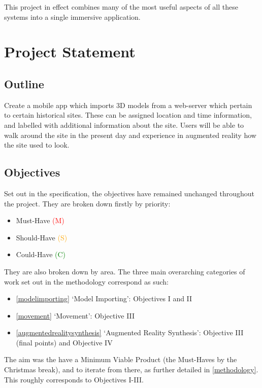 \documentclass{article}
\newcommand{\must}[1]{\textcolor{red}{#1}}
\newcommand{\should}[1]{\textcolor{orange}{#1}}
\newcommand{\could}[1]{\textcolor{green}{#1}}
\begin{document}
This project in effect combines many of the most useful aspects of all these systems into a single immersive application.

\section{Project Statement}
\subsection{Outline}
Create a mobile app which imports 3D models from a web-server which pertain to certain historical sites. These can be assigned location and time information, and labelled with additional information about the site. Users will be able to walk around the site in the present day and experience in augmented reality how the site used to look.

\subsection{Objectives}
\label{Objectives}
Set out in the specification, the objectives have remained unchanged throughout the project. They are broken down firstly by priority: 
\begin{itemize}
    \item Must-Have \must{(M)}
    \item Should-Have \should{(S)}
    \item Could-Have \could{(C)}
\end{itemize}

They are also broken down by area. The three main overarching categories of work set out in the methodology correspond as such:
\begin{itemize}
    \item \ref{modelimporting} `Model Importing': Objectives I and II 
    \item \ref{movement} `Movement': Objective III 
    \item \ref{augmentedrealitysynthesis} `Augmented Reality Synthesis': Objective III (final points) and Objective IV 
\end{itemize}

The aim was the have a Minimum Viable Product (the Must-Haves by the Christmas break), and to iterate from there, as further detailed in \ref{methodology}. This roughly corresponds to Objectives I-III.
\end{document}
